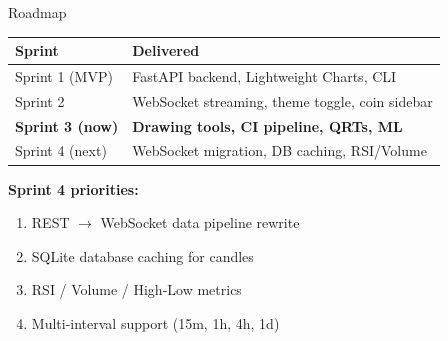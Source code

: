 \documentclass[11pt]{beamer}
\begin{document}
\begin{frame}{Roadmap}
    \begin{tabular}{ll}
        \toprule
        \textbf{Sprint} & \textbf{Delivered} \\
        \midrule
        Sprint 1 (MVP) & FastAPI backend, Lightweight Charts, CLI \\
        Sprint 2 & WebSocket streaming, theme toggle, coin sidebar \\
        \textbf{Sprint 3 (now)} & \textbf{Drawing tools, CI pipeline, QRTs, ML} \\
        Sprint 4 (next) & WebSocket migration, DB caching, RSI/Volume \\
        \bottomrule
    \end{tabular}

    \vspace{0.4cm}
    \textbf{Sprint 4 priorities:}
    \begin{enumerate}
        \item REST $\to$ WebSocket data pipeline rewrite
        \item SQLite database caching for candles
        \item RSI / Volume / High-Low metrics
        \item Multi-interval support (15m, 1h, 4h, 1d)
    \end{enumerate}
\end{frame}
\end{document}
